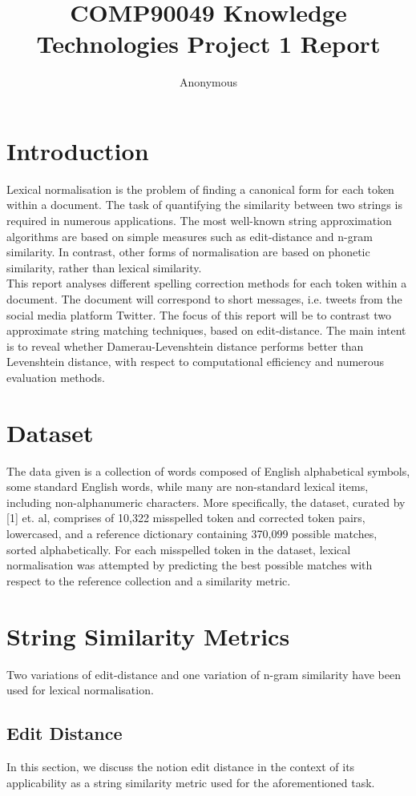 \documentclass[11pt]{article}
\title{COMP90049 Knowledge Technologies Project 1 Report}
\author{Anonymous}
\begin{document}
\maketitle


\section{Introduction}
Lexical normalisation is the problem of finding a canonical form for each token within a document. The task of quantifying the similarity between two strings is required in numerous applications. The most well-known string approximation algorithms are based on simple measures such as edit-distance and n-gram similarity. In contrast, other forms of normalisation are based on phonetic similarity, rather than lexical similarity.
\\

This report analyses different spelling correction methods for each token within a document. The document will correspond to short messages, i.e. tweets from the social media platform Twitter. The focus of this report will be to contrast two approximate string matching techniques, based on edit-distance. The main intent is to reveal whether Damerau-Levenshtein distance performs better than Levenshtein distance, with respect to computational efficiency and numerous evaluation methods.

\section{Dataset}
The data given is a collection of words composed of English alphabetical symbols, some standard English words, while many are non-standard lexical items, including non-alphanumeric characters.
More specifically, the dataset, curated by [1] et. al, comprises of 10,322 misspelled token and corrected token pairs, lowercased, and a reference dictionary containing 370,099 possible matches, sorted alphabetically. For each misspelled token in the dataset, lexical normalisation was attempted by predicting the best possible matches with respect to the reference collection and a similarity metric.

\section{String Similarity Metrics}
Two variations of edit-distance and one variation of n-gram similarity have been used for lexical normalisation.
\subsection{Edit Distance}
In this section, we discuss the notion edit distance in the context of its applicability as a string similarity metric used for the aforementioned task. 
\end{document}
